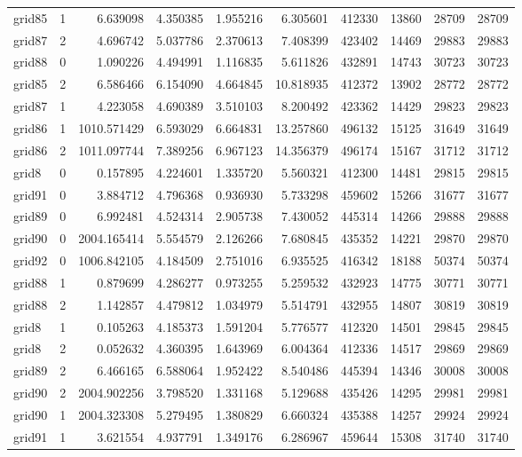 \begin{longtable}{|l|r|r|r|r|r|r|r|r|r|}
grid85 & 1 & 6.639098 & 4.350385 & 1.955216 & 6.305601 & 412330 & 13860 & 28709 & 28709 \\
grid87 & 2 & 4.696742 & 5.037786 & 2.370613 & 7.408399 & 423402 & 14469 & 29883 & 29883 \\
grid88 & 0 & 1.090226 & 4.494991 & 1.116835 & 5.611826 & 432891 & 14743 & 30723 & 30723 \\
grid85 & 2 & 6.586466 & 6.154090 & 4.664845 & 10.818935 & 412372 & 13902 & 28772 & 28772 \\
grid87 & 1 & 4.223058 & 4.690389 & 3.510103 & 8.200492 & 423362 & 14429 & 29823 & 29823 \\
grid86 & 1 & 1010.571429 & 6.593029 & 6.664831 & 13.257860 & 496132 & 15125 & 31649 & 31649 \\
grid86 & 2 & 1011.097744 & 7.389256 & 6.967123 & 14.356379 & 496174 & 15167 & 31712 & 31712 \\
grid8 & 0 & 0.157895 & 4.224601 & 1.335720 & 5.560321 & 412300 & 14481 & 29815 & 29815 \\
grid91 & 0 & 3.884712 & 4.796368 & 0.936930 & 5.733298 & 459602 & 15266 & 31677 & 31677 \\
grid89 & 0 & 6.992481 & 4.524314 & 2.905738 & 7.430052 & 445314 & 14266 & 29888 & 29888 \\
grid90 & 0 & 2004.165414 & 5.554579 & 2.126266 & 7.680845 & 435352 & 14221 & 29870 & 29870 \\
grid92 & 0 & 1006.842105 & 4.184509 & 2.751016 & 6.935525 & 416342 & 18188 & 50374 & 50374 \\
grid88 & 1 & 0.879699 & 4.286277 & 0.973255 & 5.259532 & 432923 & 14775 & 30771 & 30771 \\
grid88 & 2 & 1.142857 & 4.479812 & 1.034979 & 5.514791 & 432955 & 14807 & 30819 & 30819 \\
grid8 & 1 & 0.105263 & 4.185373 & 1.591204 & 5.776577 & 412320 & 14501 & 29845 & 29845 \\
grid8 & 2 & 0.052632 & 4.360395 & 1.643969 & 6.004364 & 412336 & 14517 & 29869 & 29869 \\
grid89 & 2 & 6.466165 & 6.588064 & 1.952422 & 8.540486 & 445394 & 14346 & 30008 & 30008 \\
grid90 & 2 & 2004.902256 & 3.798520 & 1.331168 & 5.129688 & 435426 & 14295 & 29981 & 29981 \\
grid90 & 1 & 2004.323308 & 5.279495 & 1.380829 & 6.660324 & 435388 & 14257 & 29924 & 29924 \\
grid91 & 1 & 3.621554 & 4.937791 & 1.349176 & 6.286967 & 459644 & 15308 & 31740 & 31740 \\

\end{longtable}
